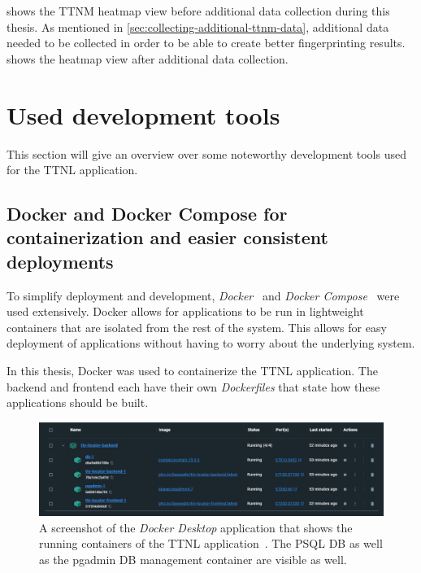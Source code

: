  shows the \ac{TTNM} heatmap view before additional data collection during this thesis.
As mentioned in \cref{sec:collecting-additional-ttnm-data}, additional data needed to be collected in order to be able to create better fingerprinting results.
 shows the heatmap view after additional data collection.

\section{Used development tools}

This section will give an overview over some noteworthy development tools used for the \ac{TTNL} application.

\subsection{Docker and Docker Compose for containerization and easier consistent deployments}

To simplify deployment and development, \emph{Docker}~\cite{docker_inc_docker_2022} and \emph{Docker Compose}~\cite{docker_inc_docker_2023} were used extensively.
Docker allows for applications to be run in lightweight containers that are isolated from the rest of the system.
This allows for easy deployment of applications without having to worry about the underlying system.

In this thesis, Docker was used to containerize the \ac{TTNL} application.
The backend and frontend each have their own \emph{Dockerfiles} that state how these applications should be built.

\begin{figure}[htbp]
    \centering
    \includegraphics[width=1\textwidth]{pictures/ttn-locator/docker_desktop.png}
    \caption{
        A screenshot of the \emph{Docker Desktop} application that shows the running containers of the \ac{TTNL} application~\cite{docker_inc_download_2021}.
        The \acl{PSQL} \ac{DB} as well as the pgadmin \ac{DB} management container are visible as well.
    }\label{pic:docker-desktop}
\end{figure}

